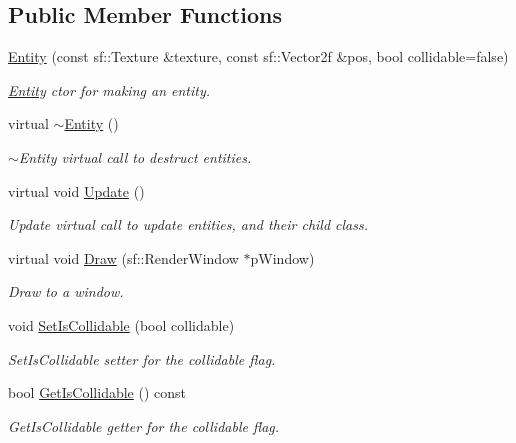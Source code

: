 \subsection*{Public Member Functions}
\begin{DoxyCompactItemize}
\item 
\hyperlink{class_entity_a5c738f826217b3f8ce83d4c6b856e3ab}{Entity} (const sf\-::\-Texture \&texture, const sf\-::\-Vector2f \&pos, bool collidable=false)
\begin{DoxyCompactList}\small\item\em \hyperlink{class_entity}{Entity} ctor for making an entity. \end{DoxyCompactList}\item 
virtual \hyperlink{class_entity_adf6d3f7cb1b2ba029b6b048a395cc8ae}{$\sim$\-Entity} ()
\begin{DoxyCompactList}\small\item\em $\sim$\-Entity virtual call to destruct entities. \end{DoxyCompactList}\item 
virtual void \hyperlink{class_entity_a7e2a7c5df3bceaf41deea192eeba4d8f}{Update} ()
\begin{DoxyCompactList}\small\item\em Update virtual call to update entities, and their child class. \end{DoxyCompactList}\item 
virtual void \hyperlink{class_entity_ad8e60d2f123abe033b2653750e7944b3}{Draw} (sf\-::\-Render\-Window $\ast$p\-Window)
\begin{DoxyCompactList}\small\item\em Draw to a window. \end{DoxyCompactList}\item 
void \hyperlink{class_entity_a5009a2ec0e07f2decfdf80bce3a66d8e}{Set\-Is\-Collidable} (bool collidable)
\begin{DoxyCompactList}\small\item\em Set\-Is\-Collidable setter for the collidable flag. \end{DoxyCompactList}\item 
bool \hyperlink{class_entity_ac4cc6941a4a04be6e143ad240c499c46}{Get\-Is\-Collidable} () const 
\begin{DoxyCompactList}\small\item\em Get\-Is\-Collidable getter for the collidable flag. \end{DoxyCompactList}\item 

\end{DoxyCompactItemize}
